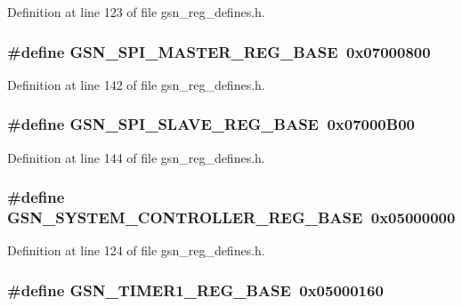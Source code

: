 Definition at line 123 of file gsn\_\-reg\_\-defines.h.

\hypertarget{a00546_a853b14921c33d8d8892d2b84bc5feb71}{
\subsubsection[{GSN\_\-SPI\_\-MASTER\_\-REG\_\-BASE}]{\setlength{\rightskip}{0pt plus 5cm}\#define GSN\_\-SPI\_\-MASTER\_\-REG\_\-BASE~0x07000800}}
\label{a00546_a853b14921c33d8d8892d2b84bc5feb71}


Definition at line 142 of file gsn\_\-reg\_\-defines.h.

\hypertarget{a00546_af542e14280562eb53e8b3dbab83b4b1a}{
\subsubsection[{GSN\_\-SPI\_\-SLAVE\_\-REG\_\-BASE}]{\setlength{\rightskip}{0pt plus 5cm}\#define GSN\_\-SPI\_\-SLAVE\_\-REG\_\-BASE~0x07000B00}}
\label{a00546_af542e14280562eb53e8b3dbab83b4b1a}


Definition at line 144 of file gsn\_\-reg\_\-defines.h.

\hypertarget{a00546_a70419b9b8bf893fe3875d36d494a5674}{
\subsubsection[{GSN\_\-SYSTEM\_\-CONTROLLER\_\-REG\_\-BASE}]{\setlength{\rightskip}{0pt plus 5cm}\#define GSN\_\-SYSTEM\_\-CONTROLLER\_\-REG\_\-BASE~0x05000000}}
\label{a00546_a70419b9b8bf893fe3875d36d494a5674}


Definition at line 124 of file gsn\_\-reg\_\-defines.h.

\hypertarget{a00546_ade0504ec26a001bab0d330bcff353edd}{
\subsubsection[{GSN\_\-TIMER1\_\-REG\_\-BASE}]{\setlength{\rightskip}{0pt plus 5cm}\#define GSN\_\-TIMER1\_\-REG\_\-BASE~0x05000160}}
\label{a00546_ade0504ec26a001bab0d330bcff353edd}



